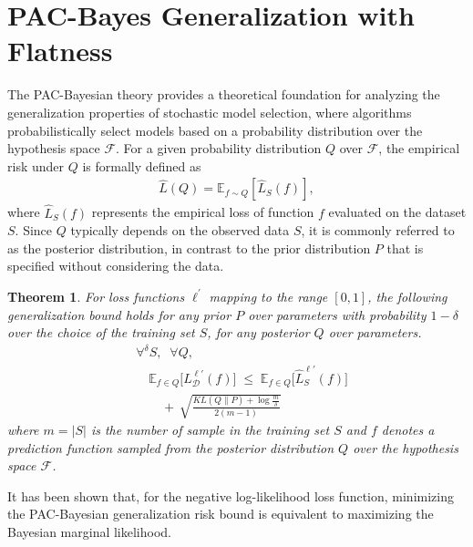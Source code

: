 \documentclass[letterpaper]{article} %
\newtheorem{theorem}{Theorem}
\begin{document}
\section{PAC-Bayes Generalization with Flatness}

The PAC-Bayesian theory provides a theoretical foundation for analyzing the generalization properties of stochastic model selection, where algorithms probabilistically select models based on a probability distribution over the hypothesis space  $\mathcal{F} $. For a given probability distribution  $Q $ over  $\mathcal{F} $, the empirical risk under  $Q $ is formally defined as 
\begin{align}
    \widehat{L}(Q) = \mathbb{E}_{f \sim Q}[\hat{L}_S(f)], 
\end{align}
where  $\hat{L}_S(f) $ represents the empirical loss of function  $f $ evaluated on the dataset  $S $. Since  $Q $ typically depends on the observed data  $S $, it is commonly referred to as the posterior distribution, in contrast to the prior distribution  $P $ that is specified without considering the data. 
\begin{theorem} \label{theorem: PAC2003}
\citep{mcallesterPACBayesianStochasticModel2003}
For loss functions $\ell^{'}$ mapping to the range $[0,1]$, the following generalization bound holds for any prior $P$ over parameters with probability $1 - \delta$ over the choice of the training set $S$, for any posterior $Q$ over parameters.
\begin{equation}\label{eq:PAC2003}
\begin{aligned}
    &\forall^{\delta} S,\;\; \forall Q, \\
    &\quad
    \mathbb{E}_{f \in Q}\big[L_{\mathcal{D}}^{\ell'}(f)\big] \;\leq\;
    \mathbb{E}_{f \in Q}\big[\widehat{L}^{\ell'}_{S}(f)\big] \\
    &\qquad
    +\, \sqrt{
        \frac{
            KL(Q\|P) + \log\frac{m}{\delta}
        }{
            2(m-1)
        }
    }
\end{aligned}
\end{equation}
where $m=|S|$ is the number of sample in the training set $S$ and $f$ denotes a prediction function sampled from the posterior distribution $Q$ over the hypothesis space $\mathcal{F}$.
\end{theorem}
It has been shown that, for the negative log-likelihood loss function, minimizing the PAC-Bayesian generalization risk bound is equivalent to maximizing the Bayesian marginal likelihood\cite{germainPACBayesianTheoryMeets2016}.
\end{document}
